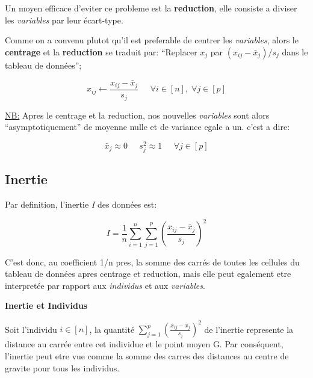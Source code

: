 \documentclass{article}
\begin{document}
Un moyen efficace d'eviter ce probleme est la \textbf{reduction}, elle consiste a diviser les \textit{variables} par leur écart-type.
\newline

Comme on a convenu plutot qu'il est preferable de centrer les \textit{variables}, alors le \textbf{centrage} et la \textbf{reduction} se traduit par: ``Replacer $x_j$ par $(x_{ij}-\bar{x}_j)/s_j$ dans le tableau de données'';

\begin{equation*}
x_{ij} \leftarrow \frac{x_{ij}-\bar{x}_j}{s_j}  \;\;\;\;\; \forall i \in [n], \; \forall j \in [p]
\end{equation*}
\newline

\underline{NB:} Apres le centrage et la reduction, nos nouvelles \textit{variables} sont alors ``asymptotiquement'' de moyenne nulle et de variance egale a un. c'est a dire:

\begin{equation*}
\bar{x}_j \approx 0 \;\;\;\;\; s_j^2 \approx 1 \;\;\;\;\; \forall j \in [p]
\end{equation*}

\subsection{Inertie}

Par definition, l'inertie \textit{I} des données est:

\begin{equation*}
I = \frac{1}{n} \sum_{i=1}^n \sum_{j=1}^p {\left( \frac{x_{ij}-\bar{x}_j}{s_j} \right)}^2
\end{equation*}

C'est donc, au coefficient 1/n pres, la somme des carrés de toutes les cellules du tableau de données apres centrage et reduction, mais elle peut egalement etre interpretée par rapport aux \textit{individus} et aux \textit{variables}.

\newpage

\begin{flushleft}
\textbf{Inertie et Individus}
\end{flushleft}

Soit l'individu $i \in [n]$, la quantité $\sum_{j=1}^p {\left( \frac{x_{ij}-\bar{x}_j}{s_j} \right)}^2$ de l'inertie represente la distance au carrée entre cet individue et le point moyen G. Par conséquent, l’inertie peut etre vue comme la somme des carres des distances au centre de gravite pour tous les individus.
\newline
\end{document}
